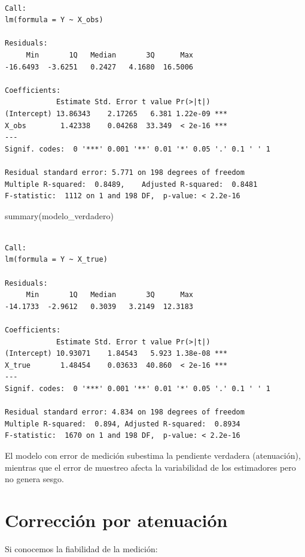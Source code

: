 \documentclass[
  spanish,
  letterpaper,
  DIV=11,
  numbers=noendperiod]{scrreprt}
\newenvironment{Shaded}{\begin{snugshade}}{\end{snugshade}}
\newcommand{\FunctionTok}[1]{\textcolor[rgb]{0.28,0.35,0.67}{#1}}
\newcommand{\NormalTok}[1]{\textcolor[rgb]{0.00,0.23,0.31}{#1}}
\begin{document}
\begin{verbatim}

Call:
lm(formula = Y ~ X_obs)

Residuals:
     Min       1Q   Median       3Q      Max 
-16.6493  -3.6251   0.2427   4.1680  16.5006 

Coefficients:
            Estimate Std. Error t value Pr(>|t|)    
(Intercept) 13.86343    2.17265   6.381 1.22e-09 ***
X_obs        1.42338    0.04268  33.349  < 2e-16 ***
---
Signif. codes:  0 '***' 0.001 '**' 0.01 '*' 0.05 '.' 0.1 ' ' 1

Residual standard error: 5.771 on 198 degrees of freedom
Multiple R-squared:  0.8489,    Adjusted R-squared:  0.8481 
F-statistic:  1112 on 1 and 198 DF,  p-value: < 2.2e-16
\end{verbatim}

\begin{Shaded}
\begin{Highlighting}[]
\FunctionTok{summary}\NormalTok{(modelo\_verdadero)}
\end{Highlighting}
\end{Shaded}

\begin{verbatim}

Call:
lm(formula = Y ~ X_true)

Residuals:
     Min       1Q   Median       3Q      Max 
-14.1733  -2.9612   0.3039   3.2149  12.3183 

Coefficients:
            Estimate Std. Error t value Pr(>|t|)    
(Intercept) 10.93071    1.84543   5.923 1.38e-08 ***
X_true       1.48454    0.03633  40.860  < 2e-16 ***
---
Signif. codes:  0 '***' 0.001 '**' 0.01 '*' 0.05 '.' 0.1 ' ' 1

Residual standard error: 4.834 on 198 degrees of freedom
Multiple R-squared:  0.894, Adjusted R-squared:  0.8934 
F-statistic:  1670 on 1 and 198 DF,  p-value: < 2.2e-16
\end{verbatim}

El modelo con error de medición subestima la pendiente verdadera
(atenuación), mientras que el error de muestreo afecta la variabilidad
de los estimadores pero no genera sesgo.

\section{Corrección por
atenuación}\label{correcciuxf3n-por-atenuaciuxf3n}

Si conocemos la fiabilidad de la medición:
\end{document}
